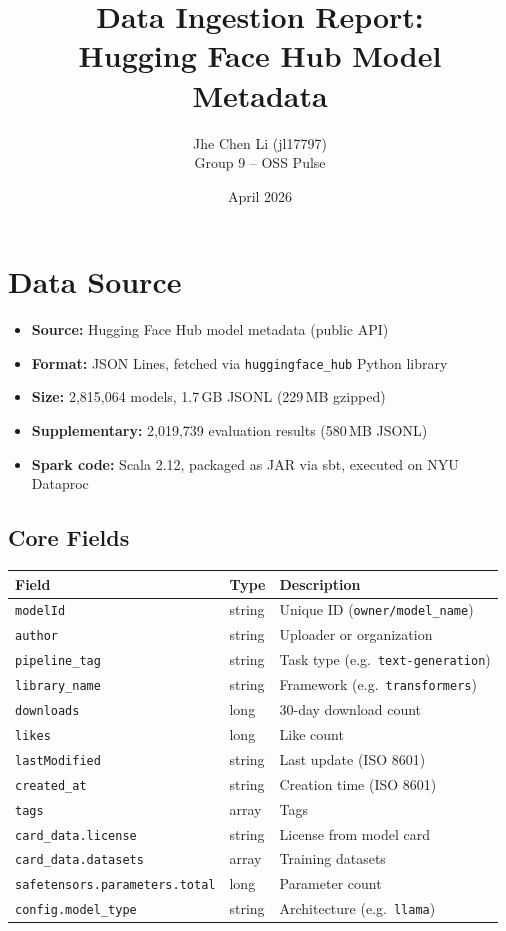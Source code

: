 \documentclass[11pt]{article}
\title{Data Ingestion Report:\\Hugging Face Hub Model Metadata}
\author{Jhe Chen Li (jl17797)\\Group 9 -- OSS Pulse}
\date{April 2026}
\begin{document}
\maketitle

\section{Data Source}

\begin{itemize}
  \item \textbf{Source:} Hugging Face Hub model metadata (public API)
  \item \textbf{Format:} JSON Lines, fetched via \texttt{huggingface\_hub} Python library
  \item \textbf{Size:} 2,815,064 models, 1.7\,GB JSONL (229\,MB gzipped)
  \item \textbf{Supplementary:} 2,019,739 evaluation results (580\,MB JSONL)
  \item \textbf{Spark code:} Scala 2.12, packaged as JAR via sbt, executed on NYU Dataproc
\end{itemize}

\subsection{Core Fields}

\begin{table}[H]
\centering\small
\begin{tabular}{lll}
\toprule
\textbf{Field} & \textbf{Type} & \textbf{Description} \\
\midrule
\texttt{modelId}       & string  & Unique ID (\texttt{owner/model\_name}) \\
\texttt{author}        & string  & Uploader or organization \\
\texttt{pipeline\_tag} & string  & Task type (e.g.\ \texttt{text-generation}) \\
\texttt{library\_name} & string  & Framework (e.g.\ \texttt{transformers}) \\
\texttt{downloads}     & long    & 30-day download count \\
\texttt{likes}         & long    & Like count \\
\texttt{lastModified}  & string  & Last update (ISO 8601) \\
\texttt{created\_at}   & string  & Creation time (ISO 8601) \\
\texttt{tags}          & array   & Tags \\
\texttt{card\_data.license}  & string & License from model card \\
\texttt{card\_data.datasets} & array  & Training datasets \\
\texttt{safetensors.parameters.total} & long & Parameter count \\
\texttt{config.model\_type} & string & Architecture (e.g.\ \texttt{llama}) \\
\bottomrule
\end{tabular}
\end{table}
\end{document}

